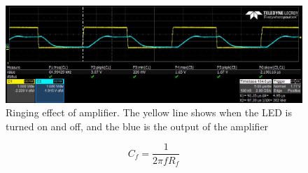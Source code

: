 \begin{figure}[ht]
\includegraphics[width=\linewidth]{img/ringing_test_filtered_rise.jpg}
\caption{Ringing effect of amplifier. The yellow line shows when the LED is turned on and off, and the blue is the output of the amplifier}
\label{fig:scope_op_amp_with_C}
\end{figure}


\begin{equation}
 C_f = \frac{1}{2 \pi f R_f} \label{eq:capacitance_approximate}
\end{equation}


